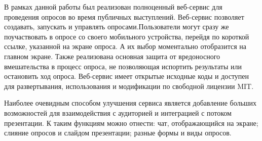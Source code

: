 \newpage
\Conc
В рамках данной работы был реализован полноценный веб-сервис для проведения опросов во время публичных выступлений. Веб-сервис позволяет создавать, запускать и управлять опросами.Пользователи могут сразу же поучаствовать в опросе со своего мобильного устройства, перейдя по короткой ссылке, указанной на экране опроса. А их выбор моментально отобразится на главном экране. Также реализована основная защита от вредоносного вмешательства в процесс опроса, не позволяющая испортить результаты или остановить ход опроса. Веб-сервис имеет открытые исходные коды и доступен для развертывания, использования и модификации по свободной лицензии MIT.    

Наиболее очевидным способом улучшения сервиса является добавление больших возможностей для взаимодействия с аудиторией и интеграцией с потоком презентации. К таким функциям можно отнести: чат, отображающийся на экране; слияние опросов и слайдом презентации; разные формы и виды опросов.


\newpage
\printbibliography[%
    heading=bibintoc%
]

\appendix
{}




